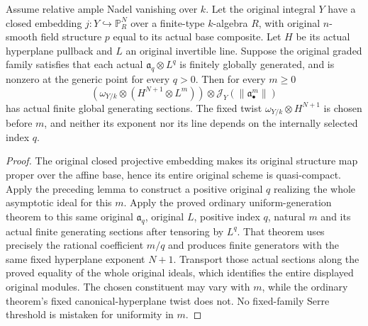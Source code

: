 \begin{theorem}
\label{thm:c0n-asymptotic-uniform-canonical-generation}
\leanok
{}
Assume relative ample Nadel vanishing over $k$. Let the original integral
$Y$ have a closed embedding $j:Y\hookrightarrow\mathbb P_R^N$ over a
finite-type $k$-algebra $R$, with original $n$-smooth field structure $p$
equal to its actual base composite. Let $H$ be its actual hyperplane
pullback and $L$ an original invertible line. Suppose the original graded
family satisfies that each actual
$\mathfrak a_q\otimes L^q$ is finitely globally generated, and is
nonzero at the generic point for every $q>0$. Then for every $m\geq0$
\[
 (\omega_{Y/k}\otimes(H^{N+1}\otimes L^m))\otimes
      \mathcal J_Y(\|\mathfrak a_\bullet^m\|)
\]
has actual finite global generating sections. The fixed twist
$\omega_{Y/k}\otimes H^{N+1}$ is chosen before $m$, and neither its
exponent nor its line depends on the internally selected index $q$.
\end{theorem}
\begin{proof}
The original closed projective embedding makes its original structure
map proper over the affine base, hence its entire original scheme is
quasi-compact. Apply the preceding lemma to construct a positive original
$q$ realizing the whole asymptotic ideal for this $m$. Apply the proved
ordinary uniform-generation theorem to this same original
$\mathfrak a_q$, original $L$, positive index $q$, natural $m$ and its
actual finite generating sections after tensoring by $L^q$. That theorem
uses precisely the rational coefficient $m/q$ and produces finite
generators with the same fixed hyperplane exponent $N+1$. Transport those
actual sections along the proved equality of the whole original ideals,
which identifies the entire displayed original modules. The chosen
constituent may vary with $m$, while the ordinary theorem's fixed
canonical-hyperplane twist does not. No fixed-family Serre threshold is
mistaken for uniformity in $m$.
\end{proof}

